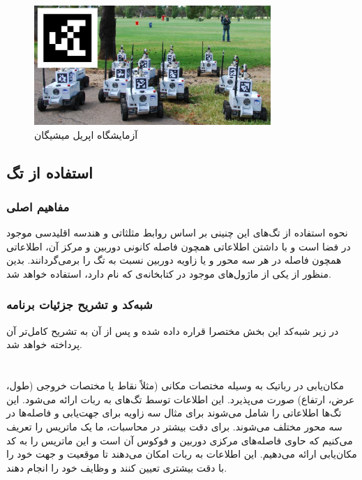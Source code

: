 \begin{figure}[H]
	\centering
	\includegraphics[width=0.8\textwidth]{./images/Chapter2/AprilTagLab}	
	\caption[آزمایشگاه اپریل میشیگان]{ آزمایشگاه اپریل میشیگان\cite{Apriltag}}
	\label{AprilTagLab}
\end{figure}
\noindent
\unskip

\newpage
\subsection{استفاده از تگ}
\subsubsection{مفاهیم اصلی}
نحوه استفاده از تگ‌های این چنینی بر اساس روابط مثلثاتی و هندسه اقلیدسی موجود در فضا است و با داشتن اطلاعاتی همچون فاصله کانونی دوربین و مرکز آن، اطلاعاتی همچون فاصله در هر سه محور و یا زاویه دوربین نسبت به تگ را برمی‌گردانند.
بدین منظور از یکی از ماژول‌های موجود در کتابخانه‌ی
که
نام دارد، استفاده خواهد شد. 
\subsubsection{شبه‌کد و تشریح جزئیات برنامه}

در زیر شبه‌کد این بخش مختصرا قراره داده شده و پس از آن به تشریح کامل‌تر آن پرداخته خواهد شد.
\section*{}
\begin{latin}
	
\end{latin}

مکان‌یابی در رباتیک به وسیله مختصات مکانی (مثلاً نقاط
یا مختصات خروجی (طول، عرض، ارتفاع) صورت می‌پذیرد. این اطلاعات توسط تگ‌های
به ربات ارائه می‌شود. این تگ‌ها اطلاعاتی را شامل می‌شوند برای مثال سه زاویه
برای جهت‌یابی و فاصله‌ها در سه محور مختلف می‌شوند. برای دقت بیشتر در محاسبات، ما یک ماتریس را تعریف می‌کنیم که حاوی فاصله‌های مرکزی دوربین و فوکوس آن است و این ماتریس را به کد مکان‌یابی ارائه می‌دهیم. این اطلاعات به ربات امکان می‌دهند تا موقعیت و جهت خود را با دقت بیشتری تعیین کنند و وظایف خود را انجام دهند.
